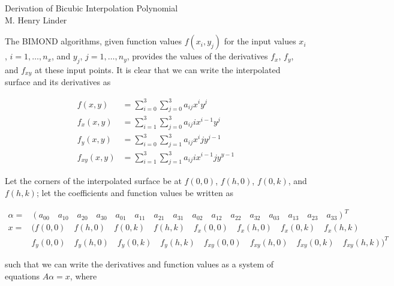 \documentclass{article}
\begin{document}
{
  \centering
  Derivation of Bicubic Interpolation Polynomial \\
  M. Henry Linder \\[.75em]
}

The BIMOND algorithms, given function values $f(x_i, y_j)$ for the
input values $x_i$, $i = 1, \dots, n_x$, and $y_j$,
$j = 1, \dots, n_y$, provides the values of the derivatives $f_x$,
$f_y$, and $f_{xy}$ at these input points. It is clear that we can
write \cite{wikibicubic} the interpolated surface and its derivatives
as

\begin{align*}
  f(x, y) &= \sum_{i=0}^3\sum_{j=0}^3 a_{ij}x^iy^j \\
  f_x(x,y) &= \sum_{i=1}^3 \sum_{j=0}^3 a_{ij}ix^{i-1}y^j \\
  f_y(x, y) &= \sum_{i=0}^3 \sum_{j=1}^3 a_{ij}x^ijy^{j-1} \\
  f_{xy}(x, y) &= \sum_{i=1}^3 \sum_{j=1}^3 a_{ij}ix^{i-1}jy^{y-1}
\end{align*}

Let the corners of the interpolated surface be at $f(0, 0)$,
$f(h, 0)$, $f(0, k)$, and $f(h, k)$; let the coefficients and function
values be written as

\begin{align*}
  \alpha =& (a_{00} \quad a_{10} \quad a_{20} \quad a_{30} \quad a_{01}
           \quad a_{11} \quad a_{21} \quad a_{31} \quad a_{02} \quad a_{12}
           \quad a_{22} \quad a_{32} \quad a_{03} \quad a_{13} \quad a_{23}
           \quad a_{33})^T \\
  x =& (f(0,0) \quad f(h,0) \quad f(0,k) \quad f(h,k) \quad f_x(0,0)
      \quad f_x(h,0) \quad f_x(0,k) \quad f_x(h,k) \\
  & f_y(0,0) \quad f_y(h,0) \quad f_y(0,k) \quad f_y(h,k) \quad f_{xy}(0,0) \quad f_{xy}(h,0) \quad f_{xy}(0,k) \quad f_{xy}(h,k))^T
\end{align*}

such that we can write the derivatives and function values as a system
of equations $A\alpha = x$, where
\end{document}
